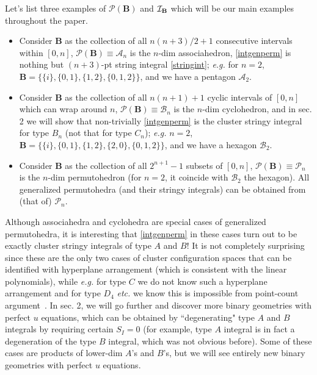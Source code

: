\documentclass[hidelinks,12pt]{article}
\begin{document}
Let's list three examples of ${\mathscr P} (\mathbf B)$ and ${\cal I}_{\mathbf B}$ which will be our main examples throughout the paper. 
\begin{itemize}
\item Consider $\mathbf B$ as the collection of all $n(n{+}3)/2+1$ consecutive intervals within $[0,n]$, ${\mathscr P}(\mathbf B) \equiv {\mathscr A}_n$ is the $n$-dim associahedron, \eqref{intgenperm} is nothing but $(n{+}3)$-pt string integral \eqref{stringint}; {\it e.g.} for $n=2$, ${\mathbf B}=\{\{i\}, \{0,1\}, \{1,2\}, \{0,1,2\}\}$, and we have a pentagon ${\mathscr A}_2$.
\item Consider $\mathbf B$ as the collection of all $n(n{+}1)+1$ cyclic intervals of $[0,n]$ which can wrap around $n$, ${\mathscr P} (\mathbf B) \equiv {\mathscr B}_n$ is the $n$-dim cyclohedron, and in sec. 2 we will show that non-trivially \eqref{intgenperm} is the cluster stringy integral for type $B_n$ (not that for type $C_n$); {\it e.g.} $n=2$, ${\mathbf B}=\{\{i\}, \{0,1\}, \{1,2\}, \{2,0\}, \{0,1,2\}\}$, and we have a hexagon ${\mathscr B}_2$.
\item Consider $\mathbf B$ as the collection of all $2^{n{+}1}-1$ subsets of $[0,n]$, ${\mathscr P}(\mathbf B) \equiv {\mathscr P}_n$ is the $n$-dim permutohedron (for $n=2$, it coincide with ${\mathscr B}_2$ the hexagon). All generalized permutohedra (and their stringy integrals) can be obtained from (that of) ${\mathscr P}_n$. 
\end{itemize}

Although associahedra and cyclohedra are special cases of generalized permutohedra, it is interesting that \eqref{intgenperm} in these cases turn out to be exactly cluster stringy integrals of type $A$ and $B$! It is not completely surprising since these are the only two cases of cluster configuration spaces that can be identified with hyperplane arrangement (which is consistent with the linear polynomials), while {\it e.g.} for type $C$ we do not know such a hyperplane arrangement and for type $D_4$ {\it etc.} we know this is impossible from point-count argument~\cite{}. In sec. 2, we will go further and discover more binary geometries with perfect $u$ equations, which can be obtained by ``degenerating" type $A$ and $B$ integrals by requiring certain $S_I=0$ (for example, type $A$ integral is in fact a degeneration of the type $B$ integral, which was not obvious before). Some of these cases are products of lower-dim $A$'s and $B$'s, but we will see entirely new binary geometries with perfect $u$ equations. 
\end{document}
